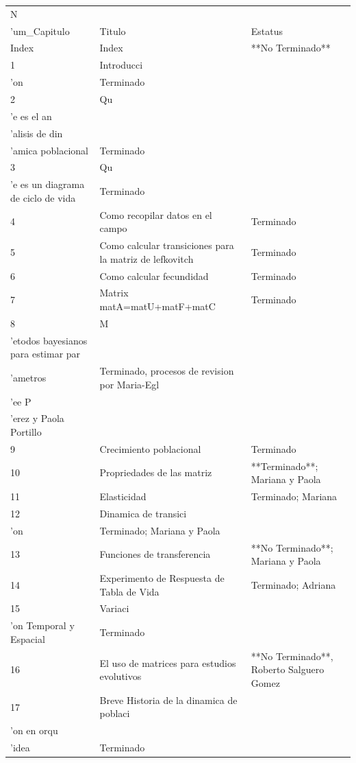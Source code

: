\documentclass[
  12pt,
  letterpaper,
]{book}
\begin{document}
\begin{table}
\fontsize{12.0pt}{14.0pt}\selectfont
\begin{tabular*}{\linewidth}{@{\extracolsep{\fill}}lll}
\toprule
N\\'um\_Capitulo & Titulo & Estatus \\ 
\midrule\addlinespace[2.5pt]
Index & Index & **No Terminado** \\ 
1 & Introducci\\'on & Terminado \\ 
2 & Qu\\'e es el an\\'alisis de din\\'amica poblacional & Terminado \\ 
3 & Qu\\'e es un diagrama de ciclo de vida & Terminado \\ 
4 & Como recopilar datos en el campo & Terminado \\ 
5 & Como calcular transiciones para la matriz de lefkovitch & Terminado \\ 
6 & Como calcular fecundidad & Terminado \\ 
7 & Matrix matA=matU+matF+matC & Terminado \\ 
8 & M\\'etodos bayesianos para estimar par\\'ametros & Terminado, procesos de revision por Maria-Egl\\'ee P\\'erez y Paola Portillo \\ 
9 & Crecimiento poblacional & Terminado \\ 
10 & Propriedades de las matriz & **Terminado**; Mariana y Paola \\ 
11 & Elasticidad & Terminado; Mariana \\ 
12 & Dinamica de transici\\'on & Terminado; Mariana y Paola \\ 
13 & Funciones de transferencia & **No Terminado**; Mariana y Paola \\ 
14 & Experimento de Respuesta de Tabla de Vida & Terminado; Adriana  \\ 
15 & Variaci\\'on Temporal y Espacial & Terminado \\ 
16 & El uso de matrices para estudios evolutivos & **No Terminado**, Roberto Salguero Gomez \\ 
17 & Breve Historia de la dinamica de poblaci\\'on en orqu\\'idea &  Terminado \\ 

\end{tabular*}
\end{table}
\end{document}
